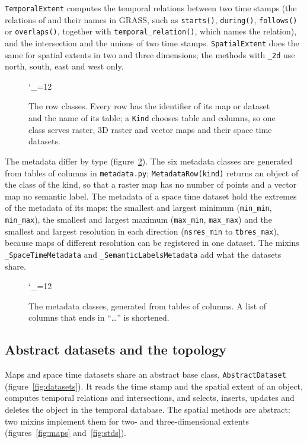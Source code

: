 \documentclass[10pt,a4paper]{article}
\newcommand{\umlfigure}[1]{%
  \begingroup\catcode`\_=12 \ttfamily\endgroup}
\newcommand{\code}[1]{\texttt{#1}}
\begin{document}
\code{TemporalExtent} computes the temporal relations between two time
stamps (the relations of \citet{allen1983} and their names in GRASS, such as
\code{starts()}, \code{during()}, \code{follows()} or \code{overlaps()},
together with \code{temporal\_relation()}, which names the relation), and the
intersection and the unions of two time stamps.
\code{SpatialExtent} does the same for spatial extents in two and three
dimensions; the methods with \code{\_2d} use north, south, east and west only.

\begin{figure}[p]
\centering
\umlfigure{rows}
\caption{The row classes. Every row has the identifier of its map or dataset
and the name of its table; a \code{Kind} chooses table and columns, so one
class serves raster, 3D raster and vector maps and their space time
datasets.}
\label{fig:rows}
\end{figure}

The metadata differ by type (figure~\ref{fig:metadata}). The six metadata
classes are generated from tables of columns in \code{metadata.py};
\code{MetadataRow(kind)} returns an object of the class of the kind, so that a
raster map has no number of points and a vector map no semantic label. The
metadata of a space time dataset hold the extremes of the metadata of its maps:
the smallest and largest minimum (\code{min\_min}, \code{min\_max}), the
smallest and largest maximum (\code{max\_min}, \code{max\_max}) and the
smallest and largest resolution in each direction (\code{nsres\_min} to
\code{tbres\_max}), because maps of different resolution can be registered in
one dataset. The mixins \code{\_SpaceTimeMetadata} and
\code{\_SemanticLabelsMetadata} add what the datasets share.

\begin{figure}[ht]
\centering
\umlfigure{metadata}
\caption{The metadata classes, generated from tables of columns. A list of
columns that ends in ``\ldots'' is shortened.}
\label{fig:metadata}
\end{figure}

\subsection{Abstract datasets and the topology}

Maps and space time datasets share an abstract base class,
\code{AbstractDataset} (figure~\ref{fig:datasets}). It reads the time stamp and
the spatial extent of an object, computes temporal relations and
intersections, and selects, inserts, updates and deletes the object in the
temporal database. The spatial methods are abstract: two mixins implement them
for two- and three-dimensional extents (figures~\ref{fig:maps}
and~\ref{fig:stds}).
\end{document}
